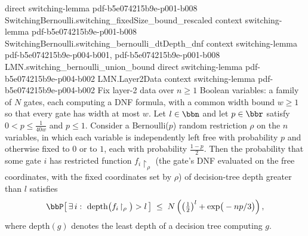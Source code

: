 \begin{theorem}
  {direct}
  {switching-lemma}
  {pdf-b5e074215b9e-p001-b008}
\proofstep
  {SwitchingBernoulli.switching_fixedSize_bound_rescaled}
  {context}
  {switching-lemma}
  {pdf-b5e074215b9e-p001-b008}
\proofstep
  {SwitchingBernoulli.switching_bernoulli_dtDepth_dnf}
  {context}
  {switching-lemma}
  {pdf-b5e074215b9e-p004-b001,
    pdf-b5e074215b9e-p001-b008}
\proofstep
  {LMN.switching_bernoulli_union_bound}
  {direct}
  {switching-lemma}
  {pdf-b5e074215b9e-p004-b002}
\proofstep
  {LMN.Layer2Data}
  {context}
  {switching-lemma}
  {pdf-b5e074215b9e-p004-b002}
Fix layer-2 data over $n \ge 1$ Boolean variables: a family of $N$ gates, each computing
a DNF formula, with a common width bound $w \ge 1$ so that every gate has width at most
$w$. Let $l \in \bbn$ and let $p \in \bbr$ satisfy $0 < p \le \tfrac{1}{40 w}$ and $p
\le 1$. Consider a Bernoulli($p$) random restriction $\rho$ on the $n$ variables, in
which each variable is independently left free with probability $p$ and otherwise fixed
to $0$ or to $1$, each with probability $\tfrac{1-p}{2}$. Then the probability that some
gate $i$ has restricted function $f_i\!\restriction_\rho$ (the gate's DNF evaluated on
the free coordinates, with the fixed coordinates set by $\rho$) of decision-tree depth
greater than $l$ satisfies
\[
\bbP\!\left[\,\exists\, i:\ \mathrm{depth}\big(f_i\!\restriction_\rho\big) > l\,\right]
  \;\le\; N\left(\left(\tfrac{1}{2}\right)^{l} + \exp\!\big(-np/3\big)\right),
\]
where $\mathrm{depth}(g)$ denotes the least depth of a decision tree computing $g$.
\end{theorem}

